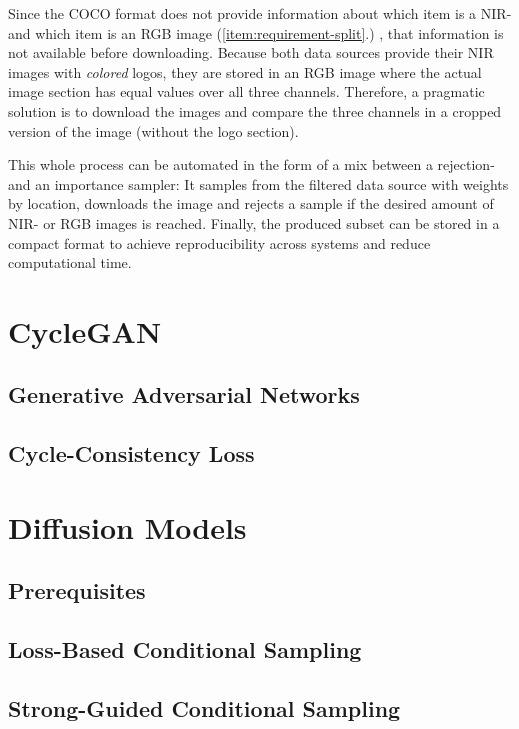 Since the COCO format does not provide information about which item is a NIR- and which item is an RGB image (\ref{item:requirement-split}.) \cite{caltech}, that information is not available before downloading.
Because both data sources provide their NIR images with \textit{colored} logos, they are stored in an RGB image where the actual image section has equal values over all three channels.
Therefore, a pragmatic solution is to download the images and compare the three channels in a cropped version of the image (without the logo section).

This whole process can be automated in the form of a mix between a rejection- and an importance sampler:
It samples from the filtered data source with weights by location, downloads the image and rejects a sample if the desired amount of NIR- or RGB images is reached.
Finally, the produced subset can be stored in a compact format to achieve reproducibility across systems and reduce computational time.

\section{CycleGAN}
\subsection{Generative Adversarial Networks}
\subsection{Cycle-Consistency Loss}
\section{Diffusion Models}
\subsection{Prerequisites}
\subsection{Loss-Based Conditional Sampling}
\subsection{Strong-Guided Conditional Sampling}